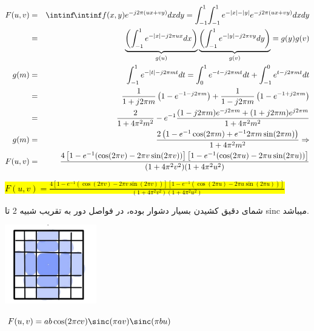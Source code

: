\begin{qsolve}
	\splitqsolve
	\begin{qsolve}[]
		\begin{eqnarray*}
			F(u,v)&=&\intinf\!\intinf f(x,y)e^{-j2\pi(ux+vy)}dxdy=
			\int_{-1}^{1}\!\int_{-1}^{1} e^{-|x|-|y|}e^{-j2\pi(ux+vy)}dxdy\\
			&=&\underbrace{\left(\int_{-1}^{1}e^{-|x|-j2\pi ux}dx\right)}_{g(u)}
			\underbrace{\left(\int_{-1}^{1}e^{-|y|-j2\pi vy}dy\right)}_{g(v)}=g(y)g(v)\\
			g(m)&=&\int_{-1}^{1}e^{-|t|-j2\pi mt}dt=\int_{0}^{1}e^{-t-j2\pi mt}dt+\int_{-1}^{0}e^{t-j2\pi mt}dt\\
			&=&\frac{1}{1+j2\pi m}\left(1-e^{-1-j2\pi m}\right)+\frac{1}{1-j2\pi m}\left(1-e^{-1+j2\pi m}\right)\\
			&=&
			\frac{2}{1+4\pi^2m^2}-e^{-1}\frac{(1-j2\pi m)e^{-j2\pi m}+(1+j2\pi m)e^{j2\pi m}}{1+4\pi^2m^2}\\
			g(m)&=&\frac{2\left(
				1-e^{-1}\cos(2\pi m)+e^{-1}2\pi m\sin(2\pi m)
				\right)}{1+4\pi^2m^2}\Rightarrow\\
			F(u,v)&=&\frac{4\left[1-e^{-1}(\cos(2\pi v)-2\pi v\sin(2\pi v))\right]
			\left[1-e^{-1}(\cos(2\pi u)-2\pi u\sin(2\pi u))\right]}
			{(1+4\pi^2v^2)(1+4\pi^2u^2)}
		\end{eqnarray*}
		\centerline{\hl{$
			F(u,v)=\frac{4\left[1-e^{-1}(\cos(2\pi v)-2\pi v\sin(2\pi v))\right]
			\left[1-e^{-1}(\cos(2\pi u)-2\pi u\sin(2\pi u))\right]}
			{(1+4\pi^2v^2)(1+4\pi^2u^2)}$}}

		شمای دقیق کشیدن بسیار دشوار بوده، در فواصل دور به تقریب شبیه 2 تا sinc میباشد.

		\begin{center}
			\includegraphics[width=4cm]{pics/q4_2_2.png}
		\end{center}
	\end{qsolve}

	\begin{latin}
		\textbullet $F(u,v)=ab\cos(2\pi cv)\sinc(\pi av)\sinc(\pi bu)$
	\end{latin}


\end{qsolve}
